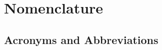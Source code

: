  \newpage


\chapter*{Nomenclature}\label{chap:symbole}

\section*{Acronyms and Abbreviations}



 \newpage

